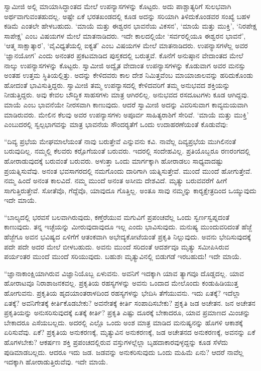  ಸ್ವಾಮೀಜಿ ಅಲ್ಲಿ ಮಾಯಾಸಿದ್ಧಾಂತದ ಮೇಲೆ ಉಪನ್ಯಾಸಗಳನ್ನು ಕೊಟ್ಟರು. ಅದು ಪಾಶ್ಚಾತ್ಯರಿಗೆ ಸುಲಭವಾಗಿ ಅರ್ಥವಾಗುವಂತಹುದಲ್ಲ. ಅಷ್ಟೇ ಏಕೆ ಭರತಖಂಡದಲ್ಲಿ ಕೂಡ ಅದನ್ನು ಸರಿಯಾಗಿ ತಿಳಿದುಕೊಂಡವರ ಸಂಖ್ಯೆ ಬಹಳ ಕಡಿಮೆ ಎಂತಲೇ ಹೇಳಬಹುದು. ‘ಮಾಯೆ ಮತ್ತು ಈಶ್ವರನ ಭಾವನೆಯ ವಿಕಸನ’, ‘ಮಾಯೆ ಮತ್ತು ಮುಕ್ತಿ’, ‘ನಿರಪೇಕ್ಷ ಸಾಪೇಕ್ಷ’ ಎಂಬ ವಿಷಯಗಳ ಮೇಲೆ ಮಾತನಾಡಿದರು. ಇದೇ ಕಾಲದಲ್ಲಿಯೇ ‘ಸರ್ವರಲ್ಲಿಯೂ ಈಶ್ವರನ ಭಾವನೆ’, ‘ಆತ್ಮ ಸಾಕ್ಷಾತ್ಕಾರ’, ‘ವೈವಿಧ್ಯತೆಯಲ್ಲಿ ಐಕ್ಯತೆ’ ಎಂಬ ವಿಷಯಗಳ ಮೇಲೆ ಮಾತನಾಡಿದರು. ಉಪನ್ಯಾಸಗಳೆಲ್ಲ ಅವರ ‘ಜ್ಞಾನಯೋಗ’ ಎಂದು ಅನಂತರ ಪ್ರಕಟಮಾಡಿದ ಪುಸ್ತಕದಲ್ಲಿ ಬರುತ್ತವೆ. ಕೊನೆಗೆ ಅನುಷ್ಠಾನ ವೇದಾಂತದ ಮೇಲೆ ನಾಲ್ಕು ಉಪನ್ಯಾಸಗಳನ್ನು ಕೊಟ್ಟರು. ಸ್ವಾಮೀಜಿ ಅದ್ವೈತ ವೇದಾಂತ ಉಪನ್ಯಾಸಗಳನ್ನು ಕೊಡುವಾಗ ಅವರ ಮನಸ್ಸು ಅಂತಹ ಉತ್ತಮ ಸ್ಥಿತಿಯಲ್ಲಿತ್ತು. ಅದನ್ನು ಕೇಳಿದವರು ಕಾಲ ದೇಶ ನಿಮಿತ್ತವೆಂಬ ಮಾಯಾಜಾಲವನ್ನು ಹರಿದುಕೊಂಡು ಹೋದಂತೆ ಭಾವಿಸುತ್ತಿದ್ದರು. ಸ್ವಾಮೀಜಿ ತಮ್ಮ ಉಪನ್ಯಾಸದಲ್ಲಿ ಕೇಳಿದವರಿಗೆ ತಮ್ಮ ಅನುಭವದ ಶಕ್ತಿಯನ್ನು ನೀಡುತ್ತಿದ್ದರು. ಅವು ಕೇವಲ ಬೌದ್ಧಿಕ ಸಾಹಸಗಳು ಮಾತ್ರ ಆಗಿರಲಿಲ್ಲ. ಅನುಭವದ ರಸದೂಟಗಳು ಕೂಡ ಆಗಿದ್ದವು. ಮಾಯೆ ಎಂಬ ಭಾವನೆಯೇ ನೀರಸವಾಗಿ ಕಾಣುವುದು. ಆದರೆ ಸ್ವಾಮೀಜಿ ಅದನ್ನು ವಿವರಿಸುವಾಗ ಕಾವ್ಯಮಯವಾಗಿ ಮಾಡಿರುವರು. ಮೇಲಿನ ಕೆಲವು ಅವರ ಉಪನ್ಯಾಸಗಳು ಅಪೂರ್ವ ಸಾಹಿತ್ಯರಾಶಿಗೆ ಸೇರಿವೆ. ‘ಮಾಯೆ ಮತ್ತು ಮುಕ್ತಿ’ ಎಂಬುದರಲ್ಲಿ ಸ್ವಲ್ಪಭಾಗವನ್ನು ಮಾತ್ರ ಭಾವನೆಯ ಸೌಂದರ‍್ಯತೆಗೆ ಒಂದು ಉದಾಹರಣೆಯಂತೆ ಕೊಡುವೆವು: 

 “ದಿವ್ಯ ಪ್ರಭೆಯ ಮೇಘಮಾಲೆಯಂತೆ ನಾವು ಬರುತ್ತೇವೆ ಎನ್ನುವನು ಕವಿ. ನಾವೆಲ್ಲ ದಿವ್ಯಪ್ರಭೆಯ ಮುಗಿಲಿನಂತೆ ಬರುವುದಿಲ್ಲ. ನಮ್ಮಲ್ಲಿ ಕೆಲವರು ಕರ‍್ಪೊಗೆಯಂತೆ ಬರುವರು. ಇದರಲ್ಲಿ ಸಂದೇಹವಿಲ್ಲ. ಪ್ರತಿಯೊಬ್ಬರೂ ರಣರಂಗದಲ್ಲಿ ಹೋರಾಡುವುದಕ್ಕೆ ಬರುವಂತೆ ಬರುವರು. ಅಳುತ್ತಾ ಒಂದು ಮಾರ್ಗಕ್ಕಾಗಿ ಹೋರಾಡಲು ಸಾಧ್ಯವಾದಷ್ಟು ಪ್ರಯತ್ನಿಸುವೆವು. ಅನಂತ ಭವಸಾಗರದಲ್ಲಿ ನಮಗೊಂದು ದಾರಿಗಾಗಿ ಯತ್ನಿಸುತ್ತೇವೆ. ಮುಂದೆ ಮುಂದೆ ಹೋಗುತ್ತೇವೆ. ನಮ್ಮ ಹಿಂದೆ ಅನಂತ ಕಾಲವಿದೆ. ನಮ್ಮ ಮುಂದೆ ಅನಂತ ಅಸೀಮ ದೇಶವಿದೆ. ಮೃತ್ಯು ಬರುವವರೆಗೆ ಹೀಗೆ ಸಾಗುತ್ತಿರುತ್ತೇವೆ. ಸೋತೆವೊ, ಗೆದ್ದೆವೊ, ಯಾವುದೂ ಗೊತ್ತಿಲ್ಲ. ಅಂತೂ ಸಾವು ನಮ್ಮನ್ನು ಕಾರ‍್ಯಕ್ಷೇತ್ರದಿಂದ ಒಯ್ಯುವುದು ಇದೇ ಮಾಯೆ. 

 “ಬಾಲ್ಯದಲ್ಲಿ ಭರವಸೆ ಬಲವಾಗಿರುವುದು, ಕಣ್ತೆರೆಯುವ ಮಗುವಿಗೆ ಪ್ರಪಂಚವೆಲ್ಲ ಒಂದು ಸ್ವರ್ಣಸ್ವಪ್ನದಂತೆ ಕಾಣುವುದು. ತನ್ನ ಇಚ್ಛೆಯನ್ನು ಮೀರುವುದಾವುದೂ ಇಲ್ಲ ಎಂದು ಭಾವಿಸುವುದು. ಮನುಷ್ಯ ಮುಂದುವರಿದಂತೆ ಹೆಜ್ಜೆ ಹೆಜ್ಜೆಗೂ ಅವನ ಭವಿಷ್ಯದ ಏಳಿಗೆಗೆ ಆತಂಕವಾಗಿ ಅಭೇದ್ಯಕೋಟೆಯಂತೆ ಪ್ರಕೃತಿ ನಿಲ್ಲುವುದು. ಅವನು ಭೇದಿಸುವುದಕ್ಕೆ ಪದೇ ಪದೇ ಅದರ ಮೇಲೆ ಬೀಳಬಹುದು. ಅವನು ಮುಂದೆ ಸರಿದಂತೆ ಆದರ್ಶವೂ ಮೃತ್ಯು ಸಮೀಪಿಸಿರುವ ಪರ್ಯಂತರ ಮುಂದೆ ಮುಂದೆ ಸರಿಯುವುದು. ಬಹುಶಃ ಮೃತ್ಯುವಿನಲ್ಲಿ ಬಿಡುಗಡೆ ಇರಬಹುದು! ಇದೇ ಮಾಯೆ. 

 “ಜ್ಞಾನಾಕಾಂಕ್ಷಿಯಾಗಿರುವ ವಿಜ್ಞಾನಿಯೊಬ್ಬ ಏಳುವನು. ಅವನಿಗೆ ಇದಕ್ಕಾಗಿ ಯಾವ ತ್ಯಾಗವೂ ದೊಡ್ಡದಲ್ಲ. ಯಾವ ಹೋರಾಟವೂ ನಿರಾಶಾಜನಕವಲ್ಲ. ಪ್ರಕೃತಿಯ ರಹಸ್ಯಗಳನ್ನು ಅವನು ಒಂದಾದ ಮೇಲೊಂದು ಕಂಡುಹಿಡಿಯುತ್ತ ಹೋಗುವನು. ಪ್ರಕೃತಿಯ ಹೃದಯಾಂತರಾಳದಿಂದ ರಹಸ್ಯಗಳನ್ನು ಭೇದಿಸಿ ತೆಗೆಯುವನು. ಇದು ಏತಕ್ಕೆ? ಇದೆಲ್ಲಾ ಏತಕ್ಕೆ? ಅವನಿಗೇತಕ್ಕೆ ಕೀರ್ತಿಕೊಡಬೇಕು? ಅವನೇತಕ್ಕೆ ಕೀರ್ತಿ ಸಂಪಾದಿಸಬೇಕು? ಪ್ರಕೃತಿ ಜಡ ಅಚೇತನ. ಜನ ಅಚೇತನ ಪ್ರಕೃತಿಯನ್ನು ಅನುಸರಿಸುವುದಕ್ಕೆ ಏತಕ್ಕೆ ಕೀರ್ತಿ? ಪ್ರಕೃತಿ ಎಷ್ಟು ದೂರಕ್ಕೆ ಬೇಕಾದರೂ, ಯಾವ ಪ್ರಮಾಣದ ಮಿಂಚನ್ನು ಬೇಕಾದರೂ ಎಸೆಯಬಲ್ಲದು. ಅದರಲ್ಲಿ ಎಲ್ಲೊ ಒಂದು ಅಂಶ ಮಾತ್ರ ಮಾಡಿದ ಮನುಷ್ಯನನ್ನು ಹೊಗಳಿ ಆಕಾಶಕ್ಕೆ ಏರಿಸುವೆವು. ಏಕೆ? ಪ್ರಕೃತಿಯ ಅನುಕರಣಕ್ಕೆ, ಮೃತ್ಯುವಿನ ಅನುಕರಣಕ್ಕೆ, ಜಡ ಅಚೇತನದ ಅನುಕರಣಕ್ಕೆ, ಅವನನ್ನು ಏಕೆ ಹೊಗಳಬೇಕು? ಆಕರ್ಷಣ ಶಕ್ತಿ ಪ್ರಪಂಚದಲ್ಲಿರುವ ವಸ್ತುಗಳಲ್ಲೆಲ್ಲಾ ಬೃಹದಾಕಾರವುಳ್ಳದ್ದನ್ನು ಕೂಡ ಸೆಳೆದು ಪುಡಿಮಾಡಬಲ್ಲದು. ಆದರೂ ಇದು ಜಡ. ಜಡವನ್ನು ಅನುಕರಿಸುವುದು ಒಂದು ಮಹಿಮೆ ಏನು? ಆದರೆ ನಾವೆಲ್ಲ ಇದಕ್ಕಾಗಿ ಹೋರಾಡುತ್ತಿರುವೆವು. ಇದೇ ಮಾಯೆ. 

